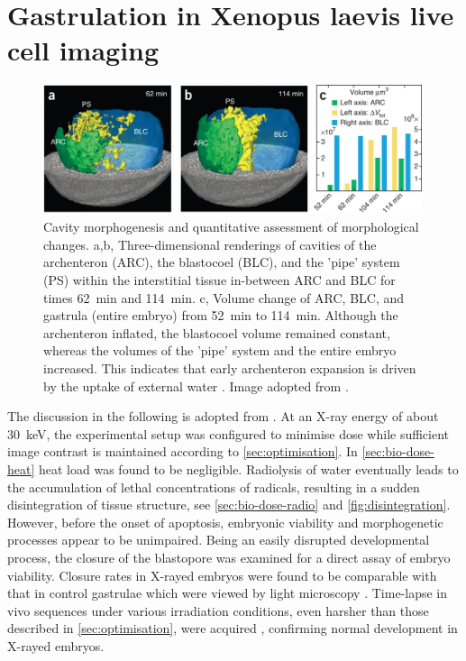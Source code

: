 \documentclass[
twoside,
openright,
titlepage,
numbers=noenddot,
headinclude,
fleqn,
a4paper,
footinclude=true,
cleardoublepage=empty,
abstractoff,
BCOR=5mm,
paper=a4,
fontsize=11pt,
british,ngerman,american,
]{scrreprt}
\begin{document}
\section{\texorpdfstring{Gastrulation in Xenopus laevis live cell imaging}{Gastrulation in Xenopus laevis live cell imaging}}
\label{sec:results}

\begin{figure}
  \centering
  \includegraphics[width=0.99\textwidth]{figures/Nature/Fig-3.jpg}
  \caption[Cavity morphogenesis and quantitative assessment of
  morphological changes.]{%
    Cavity morphogenesis and quantitative assessment of morphological
    changes.  a,b, Three-dimensional renderings of cavities of the
    archenteron (ARC), the blastocoel (BLC), and the 'pipe' system
    (PS) within the interstitial tissue in-between ARC and BLC for
    times \SI{62}{min} and \SI{114}{min}.  c, Volume change of ARC,
    BLC, and gastrula (entire embryo) from \SI{52}{min} to
    \SI{114}{min}.  Although the archenteron inflated, the blastocoel
    volume remained constant, whereas the volumes of the 'pipe' system
    and the entire embryo increased.  This indicates that early
    archenteron expansion is driven by the uptake of external water
    \cite{Tuft1962}.  Image adopted from \cite{Moosmann2014natp}.  }
  \label{fig:bio-3}
\end{figure}

The discussion in the following is adopted from
\cite{Moosmann2013nature}.  At an X-ray energy of about \SI{30}{keV},
the experimental setup was configured to minimise dose while
sufficient image contrast is maintained according to
\cref{sec:optimisation}.  In \cref{sec:bio-dose-heat} heat load was
found to be negligible.  Radiolysis of water eventually leads to the
accumulation of lethal concentrations of radicals, resulting in a
sudden disintegration of tissue structure, see
\cref{sec:bio-dose-radio} and \cref{fig:disintegration}.  However,
before the onset of apoptosis, embryonic viability and morphogenetic
processes appear to be unimpaired.  Being an easily disrupted
developmental process, the closure of the blastopore was examined for
a direct assay of embryo viability.  Closure rates in X-rayed embryos
were found to be comparable with that in control gastrulae which were
viewed by light microscopy \cite{Moosmann2013nature}.  Time-lapse in
vivo sequences under various irradiation conditions, even harsher than
those described in \cref{sec:optimisation}, were acquired
\cite{Moosmann2013Xenbase,Moosmann2013nature}, confirming normal
development in X-rayed embryos.
\end{document}
